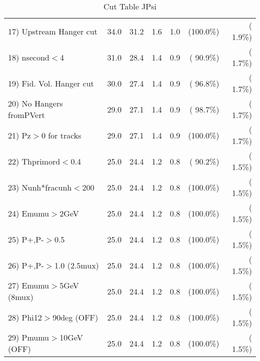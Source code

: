 \begin{table}[h!]
\begin{tabular}{||l||r|r|r|r|r|r||}
 17) Upstream Hanger cut  &         34.0 &         31.2 &          1.6 &          1.0 & (100.0\%) & (  1.9\%) \\
 18) nsecond$<$4          &         31.0 &         28.4 &          1.4 &          0.9 & ( 90.9\%) & (  1.7\%) \\
 19) Fid. Vol. Hanger cut &         30.0 &         27.4 &          1.4 &          0.9 & ( 96.8\%) & (  1.7\%) \\
 20) No Hangers fromPVert &         29.0 &         27.1 &          1.4 &          0.9 & ( 98.7\%) & (  1.7\%) \\
 21) Pz$>$0 for tracks    &         29.0 &         27.1 &          1.4 &          0.9 & (100.0\%) & (  1.7\%) \\
 22) Thprimord$<$0.4      &         25.0 &         24.4 &          1.2 &          0.8 & ( 90.2\%) & (  1.5\%) \\
 23) Nunh*fracunh$<$200   &         25.0 &         24.4 &          1.2 &          0.8 & (100.0\%) & (  1.5\%) \\
 24) Emumu$>$2GeV         &         25.0 &         24.4 &          1.2 &          0.8 & (100.0\%) & (  1.5\%) \\
 25) P+,P-$>$0.5          &         25.0 &         24.4 &          1.2 &          0.8 & (100.0\%) & (  1.5\%) \\
 26) P+,P-$>$1.0 (2.5mux) &         25.0 &         24.4 &          1.2 &          0.8 & (100.0\%) & (  1.5\%) \\
 27) Emumu$>$5GeV  (8mux) &         25.0 &         24.4 &          1.2 &          0.8 & (100.0\%) & (  1.5\%) \\
 28) Phi12$>$90deg  (OFF) &         25.0 &         24.4 &          1.2 &          0.8 & (100.0\%) & (  1.5\%) \\
 29) Pmumu$>$10GeV  (OFF) &         25.0 &         24.4 &          1.2 &          0.8 & (100.0\%) & (  1.5\%) \\
 \hline
 \hline
 \end{tabular}
 \caption{Cut Table  JPsi     }
 \label{tab-cutcohjpsi-mumu_cohrhop}
 \end{table}
